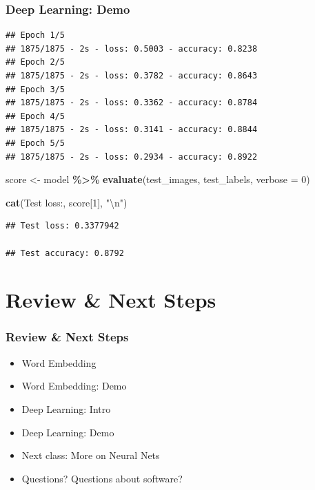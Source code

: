 \documentclass[
  shownotes,
  xcolor={svgnames},
  hyperref={colorlinks,citecolor=DarkBlue,linkcolor=DarkRed,urlcolor=DarkBlue}
  , aspectratio=169]{beamer}
\newenvironment{Shaded}{\begin{snugshade}}{\end{snugshade}}
\newcommand{\CharTok}[1]{\textcolor[rgb]{0.31,0.60,0.02}{#1}}
\newcommand{\DataTypeTok}[1]{\textcolor[rgb]{0.13,0.29,0.53}{#1}}
\newcommand{\DecValTok}[1]{\textcolor[rgb]{0.00,0.00,0.81}{#1}}
\newcommand{\KeywordTok}[1]{\textcolor[rgb]{0.13,0.29,0.53}{\textbf{#1}}}
\newcommand{\NormalTok}[1]{#1}
\newcommand{\OperatorTok}[1]{\textcolor[rgb]{0.81,0.36,0.00}{\textbf{#1}}}
\newcommand{\StringTok}[1]{\textcolor[rgb]{0.31,0.60,0.02}{#1}}
\begin{document}
\begin{frame}[fragile]
\frametitle{Deep Learning: Demo}
\begin{scriptsize}
\begin{verbatim}
## Epoch 1/5
## 1875/1875 - 2s - loss: 0.5003 - accuracy: 0.8238
## Epoch 2/5
## 1875/1875 - 2s - loss: 0.3782 - accuracy: 0.8643
## Epoch 3/5
## 1875/1875 - 2s - loss: 0.3362 - accuracy: 0.8784
## Epoch 4/5
## 1875/1875 - 2s - loss: 0.3141 - accuracy: 0.8844
## Epoch 5/5
## 1875/1875 - 2s - loss: 0.2934 - accuracy: 0.8922
\end{verbatim}
\end{scriptsize}

\begin{Shaded}
\begin{Highlighting}[]
\NormalTok{score \textless{}{-}}\StringTok{ }\NormalTok{model }\OperatorTok{\%\textgreater{}\%}\StringTok{ }\KeywordTok{evaluate}\NormalTok{(test\_images, test\_labels, }\DataTypeTok{verbose =} \DecValTok{0}\NormalTok{)}

\KeywordTok{cat}\NormalTok{(}\StringTok{\textquotesingle{}Test loss:\textquotesingle{}}\NormalTok{, score[}\DecValTok{1}\NormalTok{], }\StringTok{"}\CharTok{\textbackslash{}n}\StringTok{"}\NormalTok{)}
\end{Highlighting}
\end{Shaded}
\begin{scriptsize}

\begin{verbatim}
## Test loss: 0.3377942

## Test accuracy: 0.8792
\end{verbatim}
\end{scriptsize}
\end{frame}
\section{Review
 \& Next Steps}
\begin{frame}
\frametitle{Review \& Next Steps}
  
\begin{itemize} 
  
\item  Word Embedding
\item  Word Embedding: Demo
\item  Deep Learning: Intro
\item  Deep Learning: Demo

    \bigskip  
  \item  Next class:  More on Neural Nets


\bigskip  
\item Questions? Questions about software? 

\end{itemize}
\end{frame}
\end{document}
